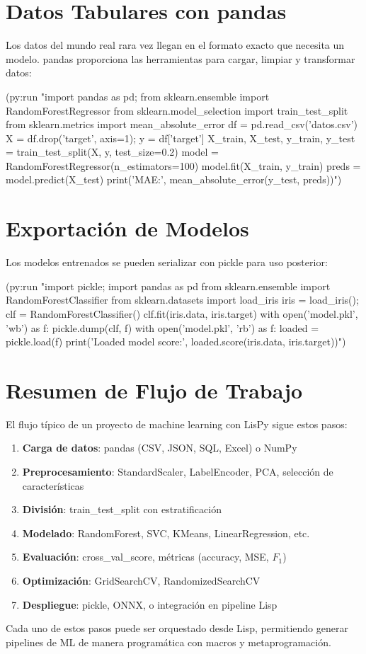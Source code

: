 \section{Datos Tabulares con pandas}

Los datos del mundo real rara vez llegan en el formato exacto que necesita
un modelo. pandas proporciona las herramientas para cargar, limpiar y
transformar datos:

\begin{lispcode}
(py:run "import pandas as pd; from sklearn.ensemble import RandomForestRegressor
from sklearn.model_selection import train_test_split
from sklearn.metrics import mean_absolute_error
df = pd.read_csv('datos.csv')
X = df.drop('target', axis=1); y = df['target']
X_train, X_test, y_train, y_test = train_test_split(X, y, test_size=0.2)
model = RandomForestRegressor(n_estimators=100)
model.fit(X_train, y_train)
preds = model.predict(X_test)
print('MAE:', mean_absolute_error(y_test, preds))")
\end{lispcode}

\section{Exportación de Modelos}

Los modelos entrenados se pueden serializar con pickle para uso posterior:

\begin{lispcode}
(py:run "import pickle; import pandas as pd
from sklearn.ensemble import RandomForestClassifier
from sklearn.datasets import load_iris
iris = load_iris(); clf = RandomForestClassifier()
clf.fit(iris.data, iris.target)
with open('model.pkl', 'wb') as f: pickle.dump(clf, f)
with open('model.pkl', 'rb') as f:
    loaded = pickle.load(f)
print('Loaded model score:', loaded.score(iris.data, iris.target))")
\end{lispcode}

\section{Resumen de Flujo de Trabajo}

El flujo típico de un proyecto de machine learning con LisPy sigue estos
pasos:

\begin{enumerate}
\item \textbf{Carga de datos}: pandas (CSV, JSON, SQL, Excel) o NumPy
\item \textbf{Preprocesamiento}: StandardScaler, LabelEncoder, PCA, selección de características
\item \textbf{División}: train\_test\_split con estratificación
\item \textbf{Modelado}: RandomForest, SVC, KMeans, LinearRegression, etc.
\item \textbf{Evaluación}: cross\_val\_score, métricas (accuracy, MSE, $F_1$)
\item \textbf{Optimización}: GridSearchCV, RandomizedSearchCV
\item \textbf{Despliegue}: pickle, ONNX, o integración en pipeline Lisp
\end{enumerate}

Cada uno de estos pasos puede ser orquestado desde Lisp, permitiendo
generar pipelines de ML de manera programática con macros y metaprogramación.

\endinput
